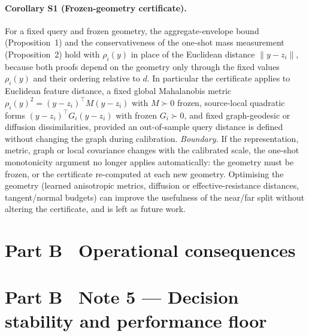 \documentclass[10pt,twocolumn]{article}
\begin{document}
\paragraph{Corollary S1 (Frozen-geometry certificate).}\label{cor:frozen}
For a fixed query and frozen geometry, the aggregate-envelope bound (Proposition~1) and the conservativeness of the one-shot mass measurement (Proposition~2) hold with $\rho_i(y)$ in place of the Euclidean distance $\lVert y-z_i\rVert$, because both proofs depend on the geometry only through the fixed values $\rho_i(y)$ and their ordering relative to $d$. In particular the certificate applies to Euclidean feature distance, a fixed global Mahalanobis metric $\rho_i(y)^2=(y-z_i)^\top M(y-z_i)$ with $M\succ0$ frozen, source-local quadratic forms $(y-z_i)^\top G_i(y-z_i)$ with frozen $G_i\succ0$, and fixed graph-geodesic or diffusion dissimilarities, provided an out-of-sample query distance is defined without changing the graph during calibration.
\noindent \emph{Boundary.} If the representation, metric, graph or local covariance changes with the calibrated scale, the one-shot monotonicity argument no longer applies automatically: the geometry must be frozen, or the certificate re-computed at each new geometry. Optimising the geometry (learned anisotropic metrics, diffusion or effective-resistance distances, tangent/normal budgets) can improve the usefulness of the near/far split without altering the certificate, and is left as future work.


\FloatBarrier
\section*{Part B \textperiodcentered\ Operational consequences}

\section*{Part B \textperiodcentered\ Note 5 --- Decision stability and performance floor}
\end{document}
